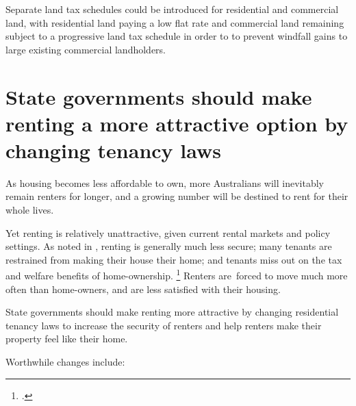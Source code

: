 Separate land tax schedules could be introduced for residential and commercial land, with residential land paying a low flat rate and commercial land remaining subject to a progressive land tax schedule in order to to prevent windfall gains to large existing commercial landholders.

\section{State governments should make renting a more attractive option by changing tenancy laws}\label{sec:states-governments-should-make-renting-a-more-attractive-option-by-changing-tenancy-laws}

As housing becomes less affordable to own, more Australians will inevitably remain renters for longer, and a growing number will be destined to rent for their whole lives.

Yet renting is relatively unattractive, given current rental markets and policy settings.
As noted in , renting is generally much less secure; many tenants are restrained from making their house their home; and tenants miss out on the tax and welfare benefits of home-ownership.%
	\footcite[][19--21]{KellyHarrisonHunterEtAl2013}
Renters are~forced to move much more often than home-owners, and are less satisfied with their housing.

State governments should make renting more attractive by changing residential tenancy laws to increase the security of renters and help renters make their property feel like their home.

Worthwhile changes include:

